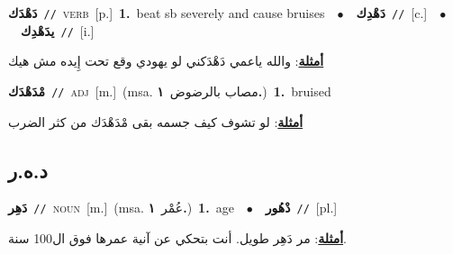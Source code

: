 \documentclass[10pt,a4paper,twoside]{article} %
\begin{document}
\begin{multicols}{2}
{\setlength\topsep{0pt}\textbf{\foreignlanguage{arabic}{دَهْدَك}}\ {\color{gray}\texttt{//}\color{black}}\ \textsc{verb}\ [p.]\ \textbf{1.}~beat sb severely and cause bruises\ \ $\bullet$\ \ \setlength\topsep{0pt}\textbf{\foreignlanguage{arabic}{دَهْدِك}}\ {\color{gray}\texttt{//}\color{black}}\ [c.]\ \ $\bullet$\ \ \setlength\topsep{0pt}\textbf{\foreignlanguage{arabic}{يدَهْدِك}}\ {\color{gray}\texttt{//}\color{black}}\ [i.]\  \begin{flushright}\color{gray}\foreignlanguage{arabic}{\textbf{\underline{\foreignlanguage{arabic}{أمثلة}}}: والله ياعمي دَهْدَكني لو يهودي وقع تحت إِيده مش هيك}\end{flushright}\color{black}} \vspace{2mm}

{\setlength\topsep{0pt}\textbf{\foreignlanguage{arabic}{مْدَهْدَك}}\ {\color{gray}\texttt{//}\color{black}}\ \textsc{adj}\ [m.]\ \color{gray}(msa. \foreignlanguage{arabic}{مصاب بالرضوض}~\foreignlanguage{arabic}{\textbf{١.}})\color{black}\ \textbf{1.}~bruised\  \begin{flushright}\color{gray}\foreignlanguage{arabic}{\textbf{\underline{\foreignlanguage{arabic}{أمثلة}}}: لو تشوف كيف جسمه بقى مْدَهْدَك من كثر الضرب}\end{flushright}\color{black}} \vspace{2mm}

\vspace{-3mm}
\subsection*{\color{blue}\foreignlanguage{arabic}{د.ه.ر}\color{blue}{}} 

{\setlength\topsep{0pt}\textbf{\foreignlanguage{arabic}{دَهِر}}\ {\color{gray}\texttt{//}\color{black}}\ \textsc{noun}\ [m.]\ \color{gray}(msa. \foreignlanguage{arabic}{عُمْر}~\foreignlanguage{arabic}{\textbf{١.}})\color{black}\ \textbf{1.}~age\ \ $\bullet$\ \ \setlength\topsep{0pt}\textbf{\foreignlanguage{arabic}{دْهُور}}\ {\color{gray}\texttt{//}\color{black}}\ [pl.]\  \begin{flushright}\color{gray}\foreignlanguage{arabic}{\textbf{\underline{\foreignlanguage{arabic}{أمثلة}}}: مر دَهِر طويل. أنت بتحكي عن آنية عمرها فوق ال100 سنة.}\end{flushright}\color{black}} \vspace{2mm}


\end{multicols}
\end{document}
